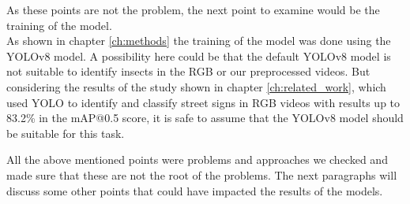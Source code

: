 As these points are not the problem, the next point to examine would be the training of the model. \\
As shown in chapter \ref{ch:methods} the training of the model was done using the YOLOv8 model. A possibility here could be that the default YOLOv8 model is not suitable to identify insects in the RGB or our preprocessed videos. But considering the results of the study shown in chapter \ref{ch:related_work}, which used YOLO to identify and classify street signs in RGB videos with results up to 83.2\% in the mAP@0.5 score, it is safe to assume that the YOLOv8 model should be suitable for this task. 

All the above mentioned points were problems and approaches we checked and made sure that these are not the root of the problems. The next paragraphs will discuss some other points that could have impacted the results of the models.




